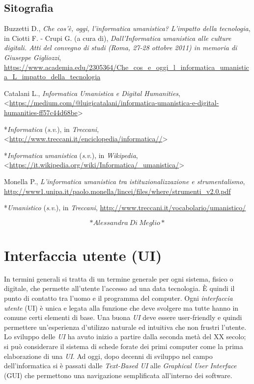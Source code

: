\documentclass[
  b5paper,
  twoside,
  12pt,
  chapterprefix=false,
  bibliography=totocnumbered,
  parskip=false]{scrbook}
\begin{document}
\hypertarget{sitografia-18}{%
\section*{Sitografia}\label{sitografia-18}}

Buzzetti D., \emph{Che cos'è, oggi, l'informatica umanistica? L'impatto della
tecnologia}, in Ciotti F. - Crupi G. (a cura di), \emph{Dall'Informatica
umanistica alle culture digitali. Atti del convegno di studi (Roma,
27-28 ottobre 2011) in memoria di Giuseppe Gigliozzi},
\href{https://www.academia.edu/2305364/Che_cos_e_oggi_l_informatica_umanistica_L_impatto_della_tecnologia}{{https://www.academia.edu/2305364/Che\_cos\_e\_oggi\_l\_informatica\_umanistica\_L\_impatto\_della\_tecnologia}}

Catalani L., \emph{Informatica Umanistica e Digital Humanities},
\textless{}\href{https://medium.com/@luigicatalani/informatica-umanistica-e-digital-humanities-ff57c44d68be}{{https://medium.com/@luigicatalani/informatica-umanistica-e-digital-humanities-ff57c44d68be}}\textgreater{}

*\emph{Informatica} (\emph{s}.\emph{v}.), in \emph{Treccani},
\textless{}\url{http://www.treccani.it/enciclopedia/informatica//}\textgreater{}

*\emph{Informatica} \emph{umanistica} (\emph{s}.\emph{v}.), in \emph{Wikipedia},
\textless{}\url{https://it.wikipedia.org/wiki/Informatica/_umanistica/}\textgreater{}

Monella P., \emph{L'informatica umanistica tra istituzionalizzazione e
strumentalismo},
\href{http://www1.unipa.it/paolo.monella/lincei/files/where/strumenti_v2.0.pdf}{{http://www1.unipa.it/paolo.monella/lincei/files/where/strumenti\_v2.0.pdf}}

*\emph{Umanistico} (\emph{s}.\emph{v}.), in \emph{Treccani},
\href{http://www.treccani.it/vocabolario/umanistico/}{{http://www.treccani.it/vocabolario/umanistico/}}

\[*Alessandra~Di~Meglio*\]

\hypertarget{interfaccia-utente-ui}{%
\chapter{Interfaccia utente (UI)}\label{interfaccia-utente-ui}}

In termini generali si tratta di un termine generale per ogni sistema,
fisico o digitale, che permette all'utente l'accesso ad una data
tecnologia. È quindi il punto di contatto tra l'uomo e il programma del
computer. Ogni \emph{interfaccia utente} (UI) è unica e legata alla funzione
che deve svolgere ma tutte hanno in comune certi elementi di base. Una
buona \emph{UI} deve essere user-friendly e quindi permettere un'esperienza
d'utilizzo naturale ed intuitiva che non frustri l'utente. Lo sviluppo
delle \emph{UI} ha avuto inizio a partire dalla seconda metà del XX secolo;
si può considerare il sistema di schede forate dei primi computer come
la prima elaborazione di una \emph{UI}. Ad oggi, dopo decenni di sviluppo nel
campo dell'informatica si è passati dalle \emph{Text-Based UI} alle
\emph{Graphical User Interface} (GUI) che permettono una navigazione
semplificata all'interno dei software.
\end{document}
